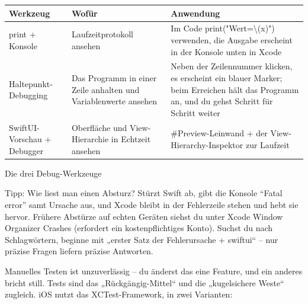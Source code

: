 


\begin{center}
\begin{tabularx}{\linewidth}{|X|X|X|}
\hline
\textbf{Werkzeug} & \textbf{Wofür} & \textbf{Anwendung} \tabularnewline
\hline
print + Konsole & Laufzeitprotokoll ansehen & Im Code print("Wert=\textbackslash{}(x)") verwenden, die Ausgabe erscheint in der Konsole unten in Xcode \tabularnewline
Haltepunkt-Debugging & Das Programm in einer Zeile anhalten und Variablenwerte ansehen & Neben der Zeilennummer klicken, es erscheint ein blauer Marker; beim Erreichen hält das Programm an, und du gehst Schritt für Schritt weiter \tabularnewline
SwiftUI-Vorschau + Debugger & Oberfläche und View-Hierarchie in Echtzeit ansehen & \#Preview-Leinwand + der View-Hierarchy-Inspektor zur Laufzeit \tabularnewline
\hline
\end{tabularx}
\end{center}

\begin{center}\small\color{gray}Die drei Debug-Werkzeuge\end{center}

\begin{tcbinfo}{Tipp: Wie liest man einen Absturz?}
Stürzt Swift ab, gibt die Konsole “Fatal error” samt Ursache aus, und Xcode bleibt in der Fehlerzeile stehen und hebt sie hervor. Frühere Abstürze auf echten Geräten siehst du unter Xcode Window Organizer Crashes (erfordert ein kostenpflichtiges Konto). Suchst du nach Schlagwörtern, beginne mit „erster Satz der Fehlerursache + swiftui“ – nur präzise Fragen liefern präzise Antworten.

\end{tcbinfo}


Manuelles Testen ist unzuverlässig – du änderst das eine Feature, und ein anderes bricht still. Tests sind das „Rückgängig-Mittel“ und die „kugelsichere Weste“ zugleich. iOS nutzt das XCTest-Framework, in zwei Varianten:

